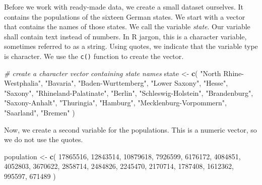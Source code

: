 \documentclass[]{book}
\newenvironment{Shaded}{\begin{snugshade}}{\end{snugshade}}
\newcommand{\KeywordTok}[1]{\textcolor[rgb]{0.13,0.29,0.53}{\textbf{#1}}}
\newcommand{\DecValTok}[1]{\textcolor[rgb]{0.00,0.00,0.81}{#1}}
\newcommand{\StringTok}[1]{\textcolor[rgb]{0.31,0.60,0.02}{#1}}
\newcommand{\CommentTok}[1]{\textcolor[rgb]{0.56,0.35,0.01}{\textit{#1}}}
\newcommand{\NormalTok}[1]{#1}
\theoremstyle{definition}
\theoremstyle{definition}
\theoremstyle{definition}
\theoremstyle{remark}
\begin{document}
Before we work with ready-made data, we create a small dataset
ourselves. It contains the populations of the sixteen German states. We
start with a vector that contains the names of those states. We call the
variable \emph{state}. Our variable shall contain text instead of
numbers. In R jargon, this is a character variable, sometimes referred
to as a string. Using quotes, we indicate that the variable type is
character. We use the \texttt{c()} function to create the vector.

\begin{Shaded}
\begin{Highlighting}[]
\CommentTok{# create a character vector containing state names}
\NormalTok{state <-}\StringTok{ }\KeywordTok{c}\NormalTok{(}
  \StringTok{"North Rhine-Westphalia"}\NormalTok{,}
  \StringTok{"Bavaria"}\NormalTok{,}
  \StringTok{"Baden-Wurttemberg"}\NormalTok{,}
  \StringTok{"Lower Saxony"}\NormalTok{,}
  \StringTok{"Hesse"}\NormalTok{,}
  \StringTok{"Saxony"}\NormalTok{,}
  \StringTok{"Rhineland-Palatinate"}\NormalTok{,}
  \StringTok{"Berlin"}\NormalTok{,}
  \StringTok{"Schleswig-Holstein"}\NormalTok{,}
  \StringTok{"Brandenburg"}\NormalTok{,}
  \StringTok{"Saxony-Anhalt"}\NormalTok{,}
  \StringTok{"Thuringia"}\NormalTok{,}
  \StringTok{"Hamburg"}\NormalTok{,}
  \StringTok{"Mecklenburg-Vorpommern"}\NormalTok{,}
  \StringTok{"Saarland"}\NormalTok{,}
  \StringTok{"Bremen"}
\NormalTok{  )}
\end{Highlighting}
\end{Shaded}

Now, we create a second variable for the populations. This is a numeric
vector, so we do not use the quotes.

\begin{Shaded}
\begin{Highlighting}[]
\NormalTok{population <-}\StringTok{ }\KeywordTok{c}\NormalTok{(}
  \DecValTok{17865516}\NormalTok{,}
  \DecValTok{12843514}\NormalTok{,}
  \DecValTok{10879618}\NormalTok{,}
  \DecValTok{7926599}\NormalTok{,}
  \DecValTok{6176172}\NormalTok{,}
  \DecValTok{4084851}\NormalTok{,}
  \DecValTok{4052803}\NormalTok{,}
  \DecValTok{3670622}\NormalTok{,}
  \DecValTok{2858714}\NormalTok{,}
  \DecValTok{2484826}\NormalTok{,}
  \DecValTok{2245470}\NormalTok{,}
  \DecValTok{2170714}\NormalTok{,}
  \DecValTok{1787408}\NormalTok{,}
  \DecValTok{1612362}\NormalTok{,}
  \DecValTok{995597}\NormalTok{,}
  \DecValTok{671489}
\NormalTok{)}
\end{Highlighting}
\end{Shaded}
\end{document}
